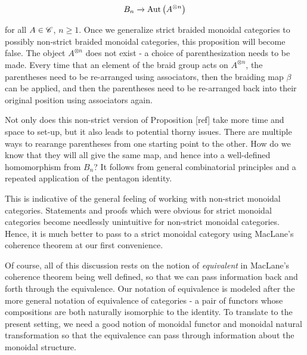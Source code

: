$$B_n \xrightarrow{} \operatorname{Aut}\left(A^{\otimes n}\right)$$

for all $A\in \mathscr{C}$, $n\geq 1$. Once we generalize strict braided monoidal categories to possibly non-strict braided monoidal categories, this proposition will become false. The object $A^{\otimes n}$ does not exist - a choice of parenthesization needs to be made. Every time that an element of the braid group acts on $A^{\otimes n}$, the parentheses need to be re-arranged using associators, then the braiding map $\beta$ can be applied, and then the parentheses need to be re-arranged back into their original position using associators again.

Not only does this non-strict version of Proposition [ref] take more time and space to set-up, but it also leads to potential thorny issues. There are multiple ways to rearange parentheses from one starting point to the other. How do we know that they will all give the same map, and hence into a well-defined homomorphism from $B_n$? It follows from general combinatorial principles and a repeated application of the pentagon identity.

This is indicative of the general feeling of working with non-strict monoidal categories. Statements and proofs which were obvious for strict monoidal categories become needlessly unintuitive for non-strict monoidal categories. Hence, it is much better to pass to a strict monoidal category using MacLane's coherence theorem at our first convenience.

Of course, all of this discussion rests on the notion of \textit{equivalent} in MacLane's coherence theorem being well defined, so that we can pass information back and forth through the equivalence. Our notation of equivalence is modeled after the more general notation of equivalence of categories - a pair of functors whose compositions are both naturally isomorphic to the identity. To translate to the present setting, we need a good notion of monoidal functor and monoidal natural transformation so that the equivalence can pass through information about the monoidal structure.

